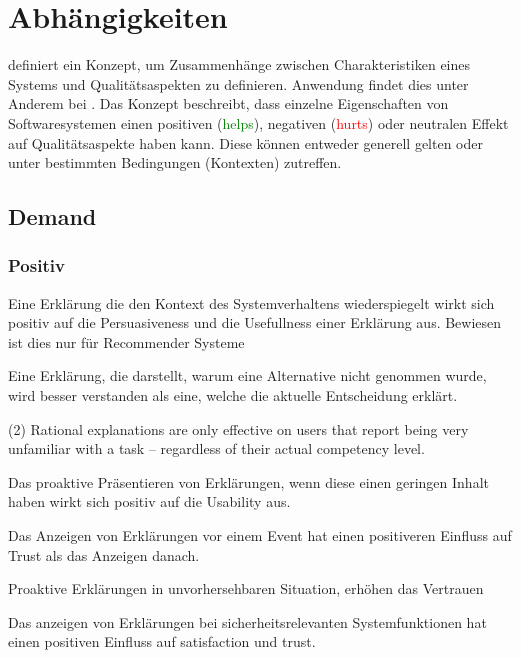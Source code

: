 \section{Abhängigkeiten}
\label{sec:model_proved_relations}

\cite{international2011iso} definiert ein Konzept, um Zusammenhänge zwischen Charakteristiken eines Systems und Qualitätsaspekten zu definieren. Anwendung findet dies unter Anderem bei \cite{carvalho2020developers}. Das Konzept beschreibt, dass einzelne Eigenschaften von Softwaresystemen einen positiven (\textcolor{green}{helps}), negativen (\textcolor{red}{hurts}) oder neutralen Effekt auf Qualitätsaspekte haben kann. Diese können entweder generell gelten oder unter bestimmten Bedingungen (Kontexten) zutreffen.

\subsection*{Demand}

\subsubsection*{Positiv}

Eine Erklärung die den Kontext des Systemverhaltens wiederspiegelt wirkt sich positiv auf die Persuasiveness und die Usefullness einer Erklärung aus. Bewiesen ist dies nur für Recommender Systeme \cite{sato_action-triggering_2019, abdulrahman_belief-based_2019}

Eine Erklärung, die darstellt, warum eine Alternative nicht genommen wurde, wird besser verstanden als eine, welche die aktuelle Entscheidung erklärt. \cite{schrills_color_2020}

(2) Rational explanations are only effective on users that report being very unfamiliar with a task – regardless of their actual competency level. \cite{schaffer_i_2019}

Das proaktive Präsentieren von Erklärungen, wenn diese einen geringen Inhalt haben wirkt sich positiv auf die Usability aus.

Das Anzeigen von Erklärungen vor einem Event hat einen positiveren Einfluss auf Trust als das Anzeigen danach. \cite{haspiel_explanations_2018}

Proaktive Erklärungen in unvorhersehbaren Situation, erhöhen das Vertrauen \cite{zhu_effects_2020}

Das anzeigen von Erklärungen bei sicherheitsrelevanten Systemfunktionen hat einen positiven Einfluss auf satisfaction und trust. \cite{wiegand2019drive}

